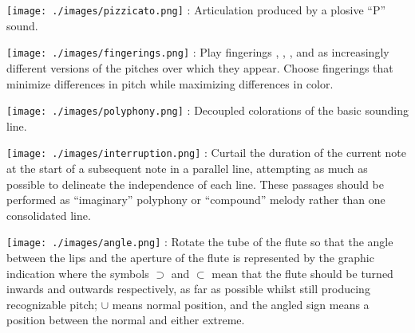 \documentclass[11pt]{article}
\newcommand*\circled[1]{\tikz[baseline=(char.base)]{
            \node[shape=circle,draw,inner sep=1pt] (char) {#1};}}
\begin{document}
\begin{multicols}{2}
\vspace*{0.25cm}

\texttt{[image: ./images/pizzicato.png]}  : Articulation produced by a plosive ``P'' sound. \\
\rightskip\leftskip
\phantom{text} \hfill \phantom{()}

\vspace*{0.25cm}

\texttt{[image: ./images/fingerings.png]}  : Play fingerings \circled{1}, \circled{2}, \circled{3}, and \circled{4} as increasingly different versions of the pitches over which they appear. Choose fingerings that minimize differences in pitch while maximizing differences in color. \\
\rightskip\leftskip
\phantom{text} \hfill \phantom{()}


\vspace*{0.25cm}

\texttt{[image: ./images/polyphony.png]}  : Decoupled colorations of the basic sounding line. \\
\rightskip\leftskip
\phantom{text} \hfill \phantom{()}


\vspace*{0.25cm}

\texttt{[image: ./images/interruption.png]}  : Curtail the duration of the current note at the start of a subsequent note in a parallel line, attempting as much as possible to delineate the independence of each line. These passages should be performed as ``imaginary'' polyphony or ``compound'' melody rather than one consolidated line. \\
\rightskip\leftskip
\phantom{text} \hfill \phantom{()}


\vspace*{0.25cm}

\texttt{[image: ./images/angle.png]}  : Rotate the tube of the flute so that the angle between the lips and the aperture of the flute is represented by the graphic indication where the symbols $\supset$ and $\subset$ mean that the flute should be turned inwards and outwards respectively, as far as possible whilst still producing recognizable pitch; $\cup$ means normal position, and the angled sign means a position between the normal and either extreme. \\
\rightskip\leftskip
\phantom{text} \hfill \phantom{()}


\end{multicols}
\end{document}
